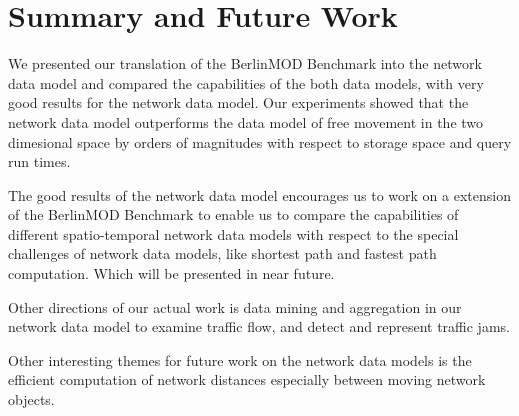 \documentclass[a4paper]{article}
\newcommand{\bmodb} {BerlinMOD Benchmark}
\begin{document}

\section{Summary and Future Work}
\label{sec:summary}
We presented our translation of the \bmodb{} into the network data model and
compared the capabilities of the both data models, with very good results for the
network data model. Our experiments showed that the network data model outperforms
the data model of free movement in the two dimesional space by orders of magnitudes
with respect to storage space and query run times.

The good results of the network data model encourages us to work on a extension
of the \bmodb{} to enable us to compare the capabilities of different spatio-temporal
network data models with respect to the special challenges of network data models,
like shortest path and fastest path computation. Which will be presented in near
future.

Other directions of our actual work is data mining and aggregation in our network
data model to examine traffic flow, and detect and represent traffic jams.

Other interesting themes for future work on the network data models is the efficient
computation of network distances especially between moving network objects.

{}

\end{document}

